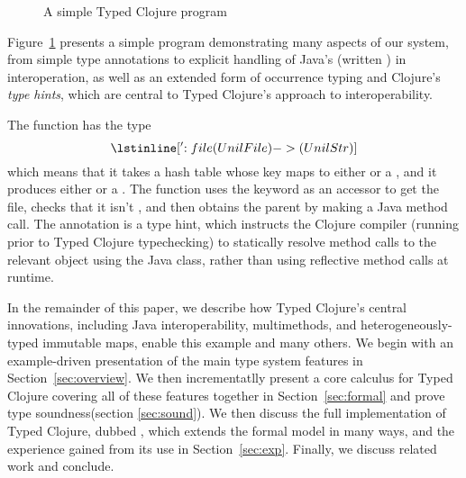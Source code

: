\begin{figure}
\inputminted[firstline=5,lastline=7]{clojure}{code/demo/src/demo/parent2.clj}
\caption{A simple Typed Clojure program}
\label{fig:ex1}
\end{figure}

Figure~\ref{fig:ex1} presents a simple program demonstrating many
aspects of our system, from simple type annotations to explicit
handling of Java's  (written ) in interoperation, as well as an
extended form of occurrence typing and Clojure's \emph{type hints},
which are central to Typed Clojure's approach to interoperability. 

The  function has the type 
$$
\clj{['{:file (U nil File)} -> (U nil Str)]}
$$
which means that it takes a hash table whose  key maps to either
 or a , and it produces either  or a
. The  function uses the  keyword
as an accessor to get the file, checks that it isn't , and
then obtains the parent by making a Java method call.
%
The annotation  is a type hint, which instructs the Clojure
compiler (running prior to Typed Clojure typechecking) to statically
resolve method calls to the relevant object using the Java 
class, rather than using reflective method calls at runtime.

In the remainder of this paper, we describe how Typed Clojure's
central innovations, including Java interoperability, multimethods,
and heterogeneously-typed immutable maps, enable this example and many
others. We begin with an example-driven presentation of the main type
system features in Section~\ref{sec:overview}. We then incrementatlly
present a core calculus for Typed Clojure covering all of these
features together in Section~\ref{sec:formal} and prove type
soundness(section \ref{sec:sound}). We then discuss the full
implementation of Typed Clojure, dubbed \coretyped{}, which extends
the formal model in many ways, and the experience gained from its use
in Section~\ref{sec:exp}. Finally, we discuss related work and
conclude.


